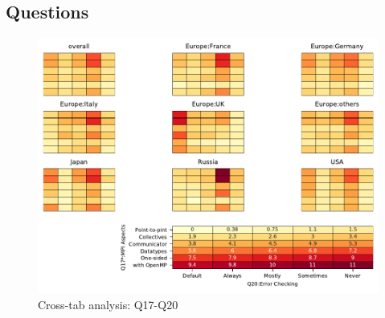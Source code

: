 
\subsection{Questions}


\begin{figure}
\begin{center}
\includegraphics[width=12cm]{../pdfs/Q17-Q20.pdf}
\caption{Cross-tab analysis: Q17-Q20}
\label{fig:Q17-Q20}
\end{center}
\end{figure}
